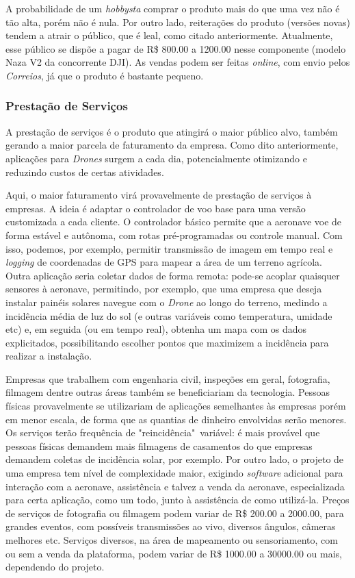 A probabilidade de um \emph{hobbysta} comprar o produto mais do que uma vez não é tão alta, porém não é nula. Por outro lado, reiterações do produto (versões novas) tendem a atrair o público, que é leal, como citado anteriormente. Atualmente, esse público se dispõe a pagar de R\$ 800.00 a 1200.00 nesse componente (modelo Naza V2 da concorrente DJI). As vendas podem ser feitas \emph{online}, com envio pelos \emph{Correios}, já que o produto é bastante pequeno.

\subsubsection*{Prestação de Serviços}

A prestação de serviços é o produto que atingirá o maior público alvo, também gerando a maior parcela de faturamento da empresa. Como dito anteriormente, aplicações para \emph{Drones} surgem a cada dia, potencialmente otimizando e reduzindo custos de certas atividades.

Aqui, o maior faturamento virá provavelmente de prestação de serviços à empresas. A ideia é adaptar o controlador de voo base para uma versão customizada a cada cliente. O controlador básico permite que a aeronave voe de forma estável e autônoma, com rotas pré-programadas ou controle manual. Com isso, podemos, por exemplo, permitir transmissão de imagem em tempo real e \emph{logging} de coordenadas de GPS para mapear a área de um terreno agrícola. Outra aplicação seria coletar dados de forma remota: pode-se acoplar quaisquer sensores à aeronave, permitindo, por exemplo, que uma empresa que deseja instalar painéis solares navegue com o \emph{Drone} ao longo do terreno, medindo a incidência média de luz do sol (e outras variáveis como temperatura, umidade etc) e, em seguida (ou em tempo real), obtenha um mapa com os dados explicitados, possibilitando escolher pontos que maximizem a incidência para realizar a instalação.

Empresas que trabalhem com engenharia civil, inspeções em geral, fotografia, filmagem dentre outras áreas também se beneficiariam da tecnologia. Pessoas físicas provavelmente se utilizariam de aplicações semelhantes às empresas porém em menor escala, de forma que as quantias de dinheiro envolvidas serão menores. Os serviços terão frequência de "reincidência"\ variável: é mais provável que pessoas físicas demandem mais filmagens de casamentos do que empresas demandem coletas de incidência solar, por exemplo. Por outro lado, o projeto de uma empresa tem nível de complexidade maior, exigindo \emph{software} adicional para interação com a aeronave, assistência e talvez a venda da aeronave, especializada para certa aplicação, como um todo, junto à assistência de como utilizá-la. Preços de serviços de fotografia ou filmagem podem variar de R\$ 200.00 a 2000.00, para grandes eventos, com possíveis transmissões ao vivo, diversos ângulos, câmeras melhores etc. Serviços diversos, na área de mapeamento ou sensoriamento, com ou sem a venda da plataforma, podem variar de R\$ 1000.00 a 30000.00 ou mais, dependendo do projeto.

